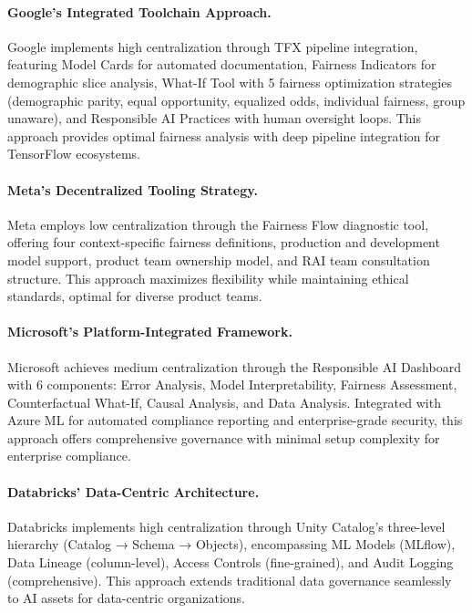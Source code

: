 \documentclass[manuscript,screen,9pt]{acmart}
\begin{document}
\begin{table}[!htb]
\paragraph{Google's Integrated Toolchain Approach.} Google implements high centralization through TFX pipeline integration, featuring Model Cards for automated documentation, Fairness Indicators for demographic slice analysis, What-If Tool with 5 fairness optimization strategies (demographic parity, equal opportunity, equalized odds, individual fairness, group unaware), and Responsible AI Practices with human oversight loops. This approach provides optimal fairness analysis with deep pipeline integration for TensorFlow ecosystems.

\paragraph{Meta's Decentralized Tooling Strategy.} Meta employs low centralization through the Fairness Flow diagnostic tool, offering four context-specific fairness definitions, production and development model support, product team ownership model, and RAI team consultation structure. This approach maximizes flexibility while maintaining ethical standards, optimal for diverse product teams.

\paragraph{Microsoft's Platform-Integrated Framework.} Microsoft achieves medium centralization through the Responsible AI Dashboard with 6 components: Error Analysis, Model Interpretability, Fairness Assessment, Counterfactual What-If, Causal Analysis, and Data Analysis. Integrated with Azure ML for automated compliance reporting and enterprise-grade security, this approach offers comprehensive governance with minimal setup complexity for enterprise compliance.

\paragraph{Databricks' Data-Centric Architecture.} Databricks implements high centralization through Unity Catalog's three-level hierarchy (Catalog → Schema → Objects), encompassing ML Models (MLflow), Data Lineage (column-level), Access Controls (fine-grained), and Audit Logging (comprehensive). This approach extends traditional data governance seamlessly to AI assets for data-centric organizations.


\end{table}
\end{document}
